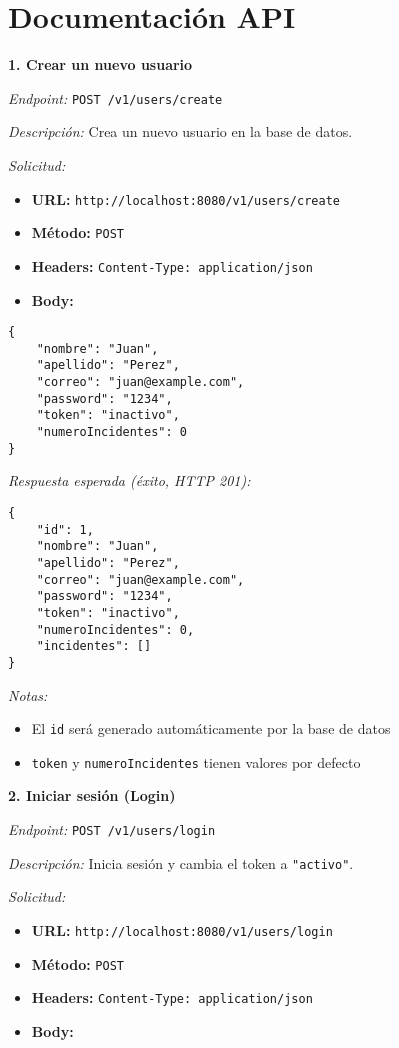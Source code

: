 \section{Documentación API}

\textbf{1. Crear un nuevo usuario}

\textit{Endpoint:} \texttt{POST /v1/users/create}

\textit{Descripción:} Crea un nuevo usuario en la base de datos.

\textit{Solicitud:}
\begin{itemize}
    \item \textbf{URL:} \texttt{http://localhost:8080/v1/users/create}
    \item \textbf{Método:} \texttt{POST}
    \item \textbf{Headers:} \texttt{Content-Type: application/json}
    \item \textbf{Body:}
\end{itemize}

\begin{lstlisting}
{
    "nombre": "Juan",
    "apellido": "Perez",
    "correo": "juan@example.com",
    "password": "1234",
    "token": "inactivo",
    "numeroIncidentes": 0
}
\end{lstlisting}

\textit{Respuesta esperada (éxito, HTTP 201):}
\begin{lstlisting}
{
    "id": 1,
    "nombre": "Juan",
    "apellido": "Perez",
    "correo": "juan@example.com",
    "password": "1234",
    "token": "inactivo",
    "numeroIncidentes": 0,
    "incidentes": []
}
\end{lstlisting}

\textit{Notas:}
\begin{itemize}
    \item El \texttt{id} será generado automáticamente por la base de datos
    \item \texttt{token} y \texttt{numeroIncidentes} tienen valores por defecto
\end{itemize}

\textbf{2. Iniciar sesión (Login)}

\textit{Endpoint:} \texttt{POST /v1/users/login}

\textit{Descripción:} Inicia sesión y cambia el token a \texttt{"activo"}.

\textit{Solicitud:}
\begin{itemize}
    \item \textbf{URL:} \texttt{http://localhost:8080/v1/users/login}
    \item \textbf{Método:} \texttt{POST}
    \item \textbf{Headers:} \texttt{Content-Type: application/json}
    \item \textbf{Body:}
\end{itemize}

